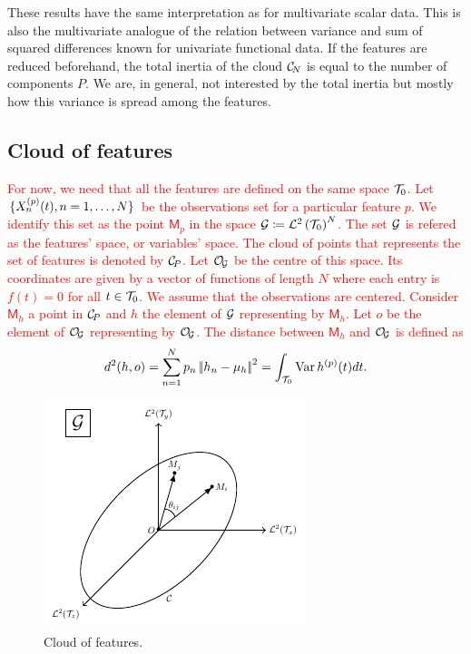 \begin{remark}
    These results have the same interpretation as for multivariate scalar data. This is also the multivariate analogue of the relation between variance and sum of squared differences known for univariate functional data. If the features are reduced beforehand, the total inertia of the cloud $\mathcal{C}_{\!N}$ is equal to the number of components $P$. We are, in general, not interested by the total inertia but mostly how this variance is spread among the features.
\end{remark}


\subsection{Cloud of features} %
\label{sub:cloud_of_features}

\textcolor{red}{For now, we need that all the features are defined on the same space $\mathcal{T}_{0}$.
Let $\{X_n^{(p)}(t), n = 1, \dots, N\}$ be the observations set for a particular feature $p$. We identify this set as the point $\mathsf{M}_p$ in the space $\mathcal{G} \coloneqq \mathcal{L}^{2}\left(\mathcal{T}_{0}\right)^N$. The set $\mathcal{G}$ is refered as the features' space, or variables' space. The cloud of points that represents the set of features is denoted by $\mathcal{C}_{\!P}$. Let $\mathcal{O}_{\!\mathcal{G}}$ be the centre of this space. Its coordinates are given by a vector of functions of length $N$ where each entry is $f(t) = 0$ for all $t \in \mathcal{T}_{0}$.
We assume that the observations are centered. Consider $\mathsf{M}_h$ a point in $\mathcal{C}_{\!P}$ and $h$ the element of $\mathcal{G}$ representing by $\mathsf{M}_h$. Let $o$ be the element of $\mathcal{O}_{\!\mathcal{G}}$ representing by $\mathcal{O}_{\!\mathcal{G}}$. The distance between $\mathsf{M}_h$ and $\mathcal{O}_{\!\mathcal{G}}$ is defined as
\begin{equation*}
d^2(h, o) = \sum_{n = 1}^N p_n \left|\!\left|h_n - \mu_h\right|\!\right|^2 = \int_{\mathcal{T}_{0}} \operatorname{Var} h^{(p)}(t)dt.
\end{equation*}
}

\begin{figure}
    \centering
    \includegraphics[scale=1.2]{figures/cloud_features.pdf}
    \caption{Cloud of features.}
    \label{fig:cloud_features}
\end{figure}

